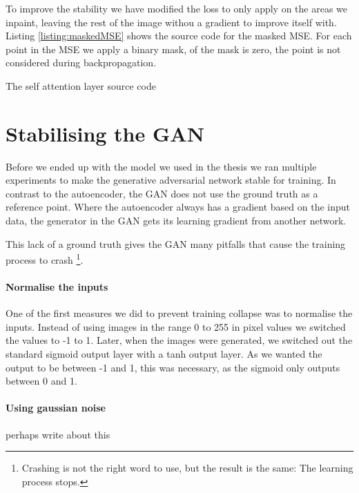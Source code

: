 

To improve the stability we have modified the loss to only apply on the areas we inpaint, leaving the rest of the image withou a gradient to improve itself with.
Listing \ref{listing:maskedMSE} shows the source code for the masked MSE. 
For each point in the MSE we apply a binary mask, of the mask is zero, the point is not considered during backpropagation.


\begin{minipage}{\linewidth}
\begin{listing}

\caption{The self attention layer source code}
\label{listing:maskedMSE}
\end{listing}
\end{minipage}





\section{Stabilising the GAN}
Before we ended up with the model we used in the thesis we ran multiple experiments to make the generative adversarial network stable for training. 
In contrast to the autoencoder, the GAN does not use the ground truth as a reference point. Where the autoencoder always has a gradient based on the input data, the generator in the GAN gets its learning gradient from another network.

This lack of a ground truth gives the GAN many pitfalls that cause the training process to crash \footnote{Crashing is not the right word to use, but the result is the same: The learning process stops.}.


\paragraph{Normalise the inputs}
One of the first measures we did to prevent training collapse was to normalise the inputs. Instead of using images in the range 0 to 255 in pixel values we switched the values to  -1 to 1. 
Later, when the images were generated, we switched out the standard sigmoid output layer with a tanh output layer. As we wanted the output to be between -1 and 1, this was necessary, as the sigmoid only outputs between 0 and 1.

\paragraph{Using gaussian noise}
perhaps write about this



